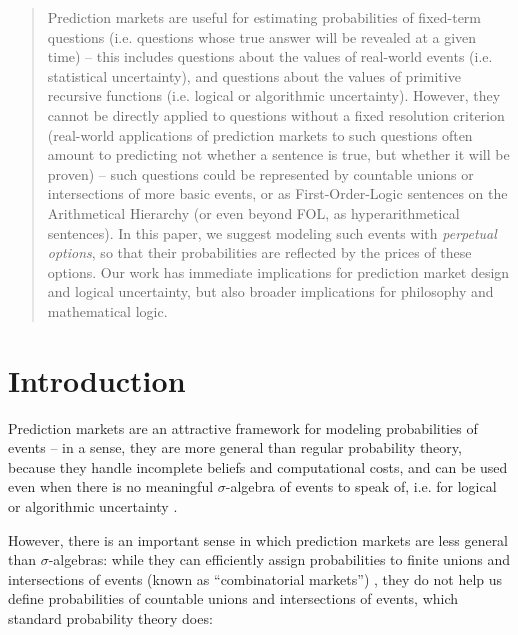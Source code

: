 \documentclass{article}
\begin{document}
\maketitle

\begin{abstract}
    Prediction markets are useful for estimating probabilities of fixed-term questions (i.e. questions whose true answer will be revealed at a given time) -- this includes questions about the values of real-world events (i.e. statistical uncertainty), and questions about the values of primitive recursive functions (i.e. logical or algorithmic uncertainty). However, they cannot be directly applied to questions without a fixed resolution criterion (real-world applications of prediction markets to such questions often amount to predicting not whether a sentence is true, but whether it will be proven) -- such questions could be represented by countable unions or intersections of more basic events, or as First-Order-Logic sentences on the Arithmetical Hierarchy (or even beyond FOL, as hyperarithmetical sentences). In this paper, we suggest modeling such events with \emph{perpetual options}, so that their probabilities are reflected by the prices of these options. Our work has immediate implications for prediction market design and logical uncertainty, but also broader implications for philosophy and mathematical logic.
\end{abstract}

\section{Introduction}

Prediction markets are an attractive framework for modeling probabilities of events -- in a sense, they are more general than regular probability theory, because they handle incomplete beliefs and computational costs, and can be used even when there is no meaningful $\sigma$-algebra of events to speak of, i.e. for logical or algorithmic uncertainty \cite{oesterheld_decision_2020, oesterheld_futarchy_2017, oesterheld_theory_2021, garrabrant_logical_2016}. 

However, there is an important sense in which prediction markets are less general than $\sigma$-algebras: while they can efficiently assign probabilities to finite unions and intersections of events (known as ``combinatorial markets'') \cite{hanson_combinatorial_2003, hanson_logarithmic_2002}, they do not help us define probabilities of countable unions and intersections of events, which standard probability theory does:
\end{document}
